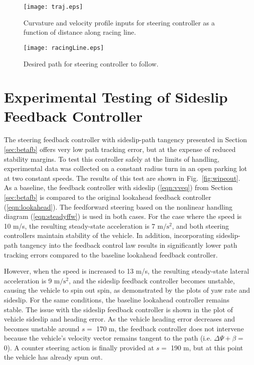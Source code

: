\begin{figure}[h]
\centering
\texttt{[image: traj.eps]}
\caption{Curvature and velocity profile inputs for steering controller as a function of distance along racing line.}
\label{fig:traj}
\end{figure}


\begin{figure}[h]
\centering
\texttt{[image: racingLine.eps]}
\caption{Desired path for steering controller to follow.}
\label{fig:thPic}
\end{figure}

\section{Experimental Testing of Sideslip Feedback \newline Controller}

The steering feedback controller with sideslip-path tangency presented in Section \ref{sec:betafb} offers very low path tracking error, but at the
expense of reduced stability margins. To test this controller safely at the limits of handling, experimental data was collected on a
constant radius turn in an open parking lot at two constant speeds. The results of this test are shown in Fig.~\ref{fig:wipeout}. As a baseline, the
feedback controller with sideslip (\ref{eqn:vveq}) from Section \ref{sec:betafb} is compared to the original lookahead feedback controller (\ref{eqn:lookahead}). 
The feedforward steering based on the nonlinear handling diagram (\ref{eqn:steadyffw}) is used in both cases. 
For the case where the speed is 10 m/s, the resulting steady-state acceleration is 7 $\mathrm{m/s^2}$, and both steering controllers maintain stability of the vehicle. 
In addition, incorporating sideslip-path tangency into the feedback control law results in significantly lower path tracking errors compared to the baseline
lookahead feedback controller.

 However, when the speed is increased to 13 m/s, the resulting steady-state lateral acceleration is 9 $\mathrm{m/s^2}$,
and the sideslip feedback controller becomes unstable, causing the vehicle to spin out spin, as demonstrated by the plots of yaw rate and sideslip. For the same conditions,
the baseline lookahead controller remains stable. The issue with the sideslip feedback controller is shown in the plot of vehicle sideslip and heading
error. As the vehicle heading error decreases and becomes unstable around $s = $ 170 m, the feedback controller does not intervene because the
 vehicle's velocity vector remains tangent to the path (i.e. $\Delta\Psi + \beta =$ 0). A counter steering action is finally provided at $s = $ 190 m, but at this point the vehicle
has already spun out.

